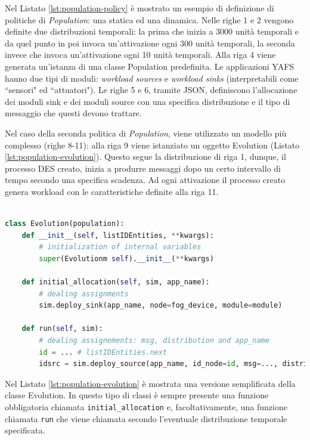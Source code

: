 Nel Listato \ref{lst:population-policy} è mostrato un esempio di definizione di politiche di \textit{Population}: una statica ed una dinamica. Nelle righe 1 e 2 vengono definite due distribuzioni temporali: la prima che inizia a 3000 unità temporali e da quel punto in poi invoca un'attivazione ogni 300 unità temporali, la seconda invece che invoca un'attivazione ogni 10 unità temporali. Alla riga 4 viene generata un'istanza di una classe Population predefinita. Le applicazioni YAFS hanno due tipi di moduli: \textit{workload sources} e \textit{workload sinks} (interpretabili come ``sensori" ed ``attuatori"). Le righe 5 e 6, tramite JSON, definiscono l'allocazione dei moduli sink e dei moduli source con una specifica distribuzione e il tipo di messaggio che questi devono trattare.

Nel caso della seconda politica di \textit{Population}, viene utilizzato un modello più complesso (righe 8-11): alla riga 9 viene istanziato un oggetto Evolution (Listato \ref{lst:population-evolution}). Questo segue la distribuzione di riga 1, dunque, il processo DES creato, inizia a produrre messaggi dopo un certo intervallo di tempo secondo una specifica scadenza. Ad ogni attivazione il processo creato genera workload con le caratteristiche definite alla riga 11.

\begin{lstlisting}[language=python, caption={Struttura di una classe Population \cite{YAFSSimulator}}, captionpos=b, label={lst:population-evolution}]

class Evolution(population):
	def __init__(self, listIDEntities, **kwargs):
		# initialization of internal variables
		super(Evolutionm self).__init__(**kwargs)
	
	def initial_allocation(self, sim, app_name):
		# dealing assignments
		sim.deploy_sink(app_name, node=fog_device, module=module)
	
	def run(self, sim):
		# dealing assignements: msg, distribution and app_name
		id = ... # listIDEntities.next
		idsrc = sim.deploy_source(app_name, id_node=id, msg=..., distribution=...)

\end{lstlisting}

Nel Listato \ref{lst:population-evolution} è mostrata una versione semplificata della classe Evolution. In questo tipo di classi è sempre presente una funzione obbligatoria chiamata \texttt{initial\_allocation} e, facoltativamente, una funzione chiamata \texttt{run} che viene chiamata secondo l'eventuale distribuzione temporale specificata.

